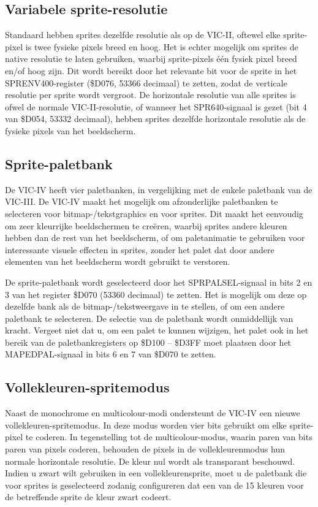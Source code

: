 \subsection{Variabele sprite-resolutie}

Standaard hebben sprites dezelfde resolutie als op de VIC-II, oftewel elke sprite-pixel is twee fysieke pixels breed en hoog. Het is echter mogelijk om sprites de native resolutie te laten gebruiken, waarbij sprite-pixels één fysiek pixel breed en/of hoog zijn. Dit wordt bereikt door het relevante bit voor de sprite in het SPRENV400-register (\$D076, 53366 decimaal) te zetten, zodat de verticale resolutie per sprite wordt vergroot. De horizontale resolutie van alle sprites is ofwel de normale VIC-II-resolutie, of wanneer het SPR640-signaal is gezet (bit 4 van \$D054, 53332 decimaal), hebben sprites dezelfde horizontale resolutie als de fysieke pixels van het beeldscherm.

\subsection{Sprite-paletbank}

De VIC-IV heeft vier paletbanken, in vergelijking met de enkele paletbank van de VIC-III. De VIC-IV maakt het mogelijk om afzonderlijke paletbanken te selecteren voor bitmap-/tekstgraphics en voor sprites. Dit maakt het eenvoudig om zeer kleurrijke beeldschermen te creëren, waarbij sprites andere kleuren hebben dan de rest van het beeldscherm, of om paletanimatie te gebruiken voor interessante visuele effecten in sprites, zonder het palet dat door andere elementen van het beeldscherm wordt gebruikt te verstoren.

De sprite-paletbank wordt geselecteerd door het SPRPALSEL-signaal in bits 2 en 3 van het register \$D070 (53360 decimaal) te zetten. Het is mogelijk om deze op dezelfde bank als de bitmap-/tekstweergave in te stellen, of om een andere paletbank te selecteren. De selectie van de paletbank wordt onmiddellijk van kracht. Vergeet niet dat u, om een palet te kunnen wijzigen, het palet ook in het bereik van de paletbankregisters op \$D100 -- \$D3FF moet plaatsen door het MAPEDPAL-signaal in bits 6 en 7 van \$D070 te zetten.

\subsection{Vollekleuren-spritemodus}

Naast de monochrome en multicolour-modi ondersteunt de VIC-IV een nieuwe vollekleuren-spritemodus. In deze modus worden vier bits gebruikt om elke sprite-pixel te coderen. In tegenstelling tot de multicolour-modus, waarin paren van bits paren van pixels coderen, behouden de pixels in de vollekleurenmodus hun normale horizontale resolutie. De kleur nul wordt als transparant beschouwd. Indien u zwart wilt gebruiken in een vollekleurensprite, moet u de paletbank die voor sprites is geselecteerd zodanig configureren dat een van de 15 kleuren voor de betreffende sprite de kleur zwart codeert.

